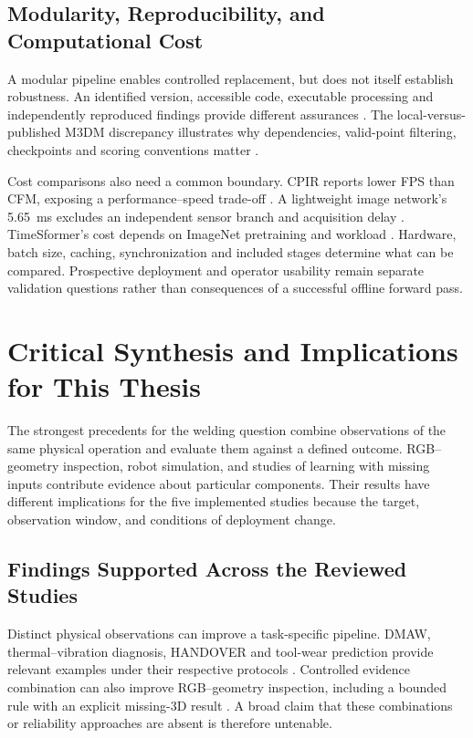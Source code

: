 \subsection{Modularity, Reproducibility, and Computational Cost}
A modular pipeline enables controlled replacement, but does not itself establish robustness. An identified version, accessible code, executable processing and independently reproduced findings provide different assurances \citep{P009}. The local-versus-published M3DM discrepancy illustrates why dependencies, valid-point filtering, checkpoints and scoring conventions matter \citep{P033}.

Cost comparisons also need a common boundary. CPIR reports lower FPS than CFM, exposing a performance--speed trade-off \citep{Shangguan2025CPIR}. A lightweight image network's 5.65~ms excludes an independent sensor branch and acquisition delay \citep[PDF p.~10, Table~V]{P035}. TimeSformer's cost depends on ImageNet pretraining and workload \citep{P034}. Hardware, batch size, caching, synchronization and included stages determine what can be compared. Prospective deployment and operator usability remain separate validation questions rather than consequences of a successful offline forward pass.

\section{Critical Synthesis and Implications for This Thesis}
The strongest precedents for the welding question combine observations of the same physical operation and evaluate them against a defined outcome. RGB--geometry inspection, robot simulation, and studies of learning with missing inputs contribute evidence about particular components. Their results have different implications for the five implemented studies because the target, observation window, and conditions of deployment change.

\subsection{Findings Supported Across the Reviewed Studies}
Distinct physical observations can improve a task-specific pipeline. DMAW, thermal--vibration diagnosis, HANDOVER and tool-wear prediction provide relevant examples under their respective protocols \citep{P003,Huo2022Multisensor,Thoduka2024Handover,P045}. Controlled evidence combination can also improve RGB--geometry inspection, including a bounded rule with an explicit missing-3D result \citep{P026}. A broad claim that these combinations or reliability approaches are absent is therefore untenable.

